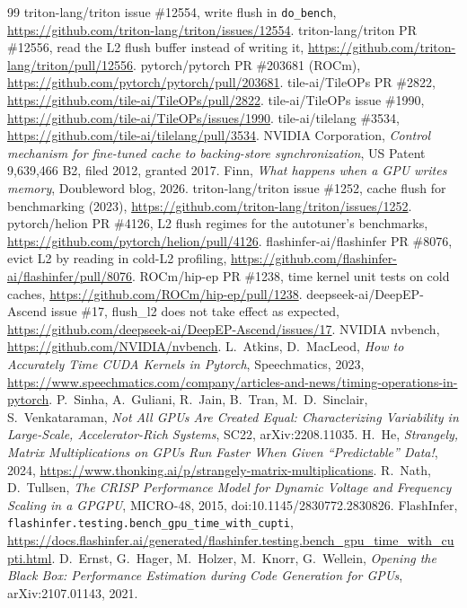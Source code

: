 \documentclass[11pt,a4paper]{article}
\begin{document}
\begin{thebibliography}{99}\small\setlength{\itemsep}{0pt}\setlength{\parskip}{0pt}
 triton-lang/triton issue \#12554, write flush in \texttt{do\_bench}, \url{https://github.com/triton-lang/triton/issues/12554}.
 triton-lang/triton PR \#12556, read the L2 flush buffer instead of writing it, \url{https://github.com/triton-lang/triton/pull/12556}.
 pytorch/pytorch PR \#203681 (ROCm), \url{https://github.com/pytorch/pytorch/pull/203681}.
 tile-ai/TileOPs PR \#2822, \url{https://github.com/tile-ai/TileOPs/pull/2822}.
 tile-ai/TileOPs issue \#1990, \url{https://github.com/tile-ai/TileOPs/issues/1990}.
 tile-ai/tilelang \#3534, \url{https://github.com/tile-ai/tilelang/pull/3534}.
 NVIDIA Corporation, \emph{Control mechanism for fine-tuned cache to backing-store synchronization}, US Patent 9,639,466 B2, filed 2012, granted 2017.
 Finn, \emph{What happens when a GPU writes memory}, Doubleword blog, 2026.
 triton-lang/triton issue \#1252, cache flush for benchmarking (2023), \url{https://github.com/triton-lang/triton/issues/1252}.
 pytorch/helion PR \#4126, L2 flush regimes for the autotuner's benchmarks, \url{https://github.com/pytorch/helion/pull/4126}.
 flashinfer-ai/flashinfer PR \#8076, evict L2 by reading in cold-L2 profiling, \url{https://github.com/flashinfer-ai/flashinfer/pull/8076}.
 ROCm/hip-ep PR \#1238, time kernel unit tests on cold caches, \url{https://github.com/ROCm/hip-ep/pull/1238}.
 deepseek-ai/DeepEP-Ascend issue \#17, flush\_l2 does not take effect as expected, \url{https://github.com/deepseek-ai/DeepEP-Ascend/issues/17}.
 NVIDIA nvbench, \url{https://github.com/NVIDIA/nvbench}.
 L.~Atkins, D.~MacLeod, \emph{How to Accurately Time CUDA Kernels in Pytorch}, Speechmatics, 2023, \url{https://www.speechmatics.com/company/articles-and-news/timing-operations-in-pytorch}.
 P.~Sinha, A.~Guliani, R.~Jain, B.~Tran, M.~D.~Sinclair, S.~Venkataraman, \emph{Not All GPUs Are Created Equal: Characterizing Variability in Large-Scale, Accelerator-Rich Systems}, SC22, arXiv:2208.11035.
 H.~He, \emph{Strangely, Matrix Multiplications on GPUs Run Faster When Given ``Predictable'' Data!}, 2024, \url{https://www.thonking.ai/p/strangely-matrix-multiplications}.
 R.~Nath, D.~Tullsen, \emph{The CRISP Performance Model for Dynamic Voltage and Frequency Scaling in a GPGPU}, MICRO-48, 2015, doi:10.1145/2830772.2830826.
 FlashInfer, \texttt{flashinfer.testing.bench\_gpu\_time\_with\_cupti}, \url{https://docs.flashinfer.ai/generated/flashinfer.testing.bench_gpu_time_with_cupti.html}.
 D.~Ernst, G.~Hager, M.~Holzer, M.~Knorr, G.~Wellein, \emph{Opening the Black Box: Performance Estimation during Code Generation for GPUs}, arXiv:2107.01143, 2021.
\end{thebibliography}
\end{document}
